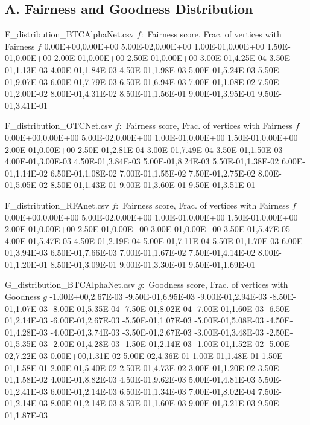 
\subsection*{A. Fairness and Goodness Distribution}


\begin{filecontents*}{F_distribution_BTCAlphaNet.csv}
  $f:$ Fairness score, Frac. of vertices with Fairness $f$
  0.00E+00,0.00E+00
  5.00E-02,0.00E+00
  1.00E-01,0.00E+00
  1.50E-01,0.00E+00
  2.00E-01,0.00E+00
  2.50E-01,0.00E+00
  3.00E-01,4.25E-04
  3.50E-01,1.13E-03
  4.00E-01,1.84E-03
  4.50E-01,1.98E-03
  5.00E-01,5.24E-03
  5.50E-01,9.07E-03
  6.00E-01,7.79E-03
  6.50E-01,6.94E-03
  7.00E-01,1.08E-02
  7.50E-01,2.00E-02
  8.00E-01,4.31E-02
  8.50E-01,1.56E-01
  9.00E-01,3.95E-01
  9.50E-01,3.41E-01
  \end{filecontents*}
  
  \begin{filecontents*}{F_distribution_OTCNet.csv}
  $f:$ Fairness score, Frac. of vertices with Fairness $f$
  0.00E+00,0.00E+00
  5.00E-02,0.00E+00
  1.00E-01,0.00E+00
  1.50E-01,0.00E+00
  2.00E-01,0.00E+00
  2.50E-01,2.81E-04
  3.00E-01,7.49E-04
  3.50E-01,1.50E-03
  4.00E-01,3.00E-03
  4.50E-01,3.84E-03
  5.00E-01,8.24E-03
  5.50E-01,1.38E-02
  6.00E-01,1.14E-02
  6.50E-01,1.08E-02
  7.00E-01,1.55E-02
  7.50E-01,2.75E-02
  8.00E-01,5.05E-02
  8.50E-01,1.43E-01
  9.00E-01,3.60E-01
  9.50E-01,3.51E-01
  \end{filecontents*}
  
  \begin{filecontents*}{F_distribution_RFAnet.csv}
  $f:$ Fairness score, Frac. of vertices with Fairness $f$
  0.00E+00,0.00E+00
  5.00E-02,0.00E+00
  1.00E-01,0.00E+00
  1.50E-01,0.00E+00
  2.00E-01,0.00E+00
  2.50E-01,0.00E+00
  3.00E-01,0.00E+00
  3.50E-01,5.47E-05
  4.00E-01,5.47E-05
  4.50E-01,2.19E-04
  5.00E-01,7.11E-04
  5.50E-01,1.70E-03
  6.00E-01,3.94E-03
  6.50E-01,7.66E-03
  7.00E-01,1.67E-02
  7.50E-01,4.14E-02
  8.00E-01,1.20E-01
  8.50E-01,3.09E-01
  9.00E-01,3.30E-01
  9.50E-01,1.69E-01
  \end{filecontents*}
  
  \begin{filecontents*}{G_distribution_BTCAlphaNet.csv}
  $g:$ Goodness score, Frac. of vertices with Goodness $g$
  -1.00E+00,2.67E-03
  -9.50E-01,6.95E-03
  -9.00E-01,2.94E-03
  -8.50E-01,1.07E-03
  -8.00E-01,5.35E-04
  -7.50E-01,8.02E-04
  -7.00E-01,1.60E-03
  -6.50E-01,2.14E-03
  -6.00E-01,2.67E-03
  -5.50E-01,1.07E-03
  -5.00E-01,5.08E-03
  -4.50E-01,4.28E-03
  -4.00E-01,3.74E-03
  -3.50E-01,2.67E-03
  -3.00E-01,3.48E-03
  -2.50E-01,5.35E-03
  -2.00E-01,4.28E-03
  -1.50E-01,2.14E-03
  -1.00E-01,1.52E-02
  -5.00E-02,7.22E-03
  0.00E+00,1.31E-02
  5.00E-02,4.36E-01
  1.00E-01,1.48E-01
  1.50E-01,1.58E-01
  2.00E-01,5.40E-02
  2.50E-01,4.73E-02
  3.00E-01,1.20E-02
  3.50E-01,1.58E-02
  4.00E-01,8.82E-03
  4.50E-01,9.62E-03
  5.00E-01,4.81E-03
  5.50E-01,2.41E-03
  6.00E-01,2.14E-03
  6.50E-01,1.34E-03
  7.00E-01,8.02E-04
  7.50E-01,2.14E-03
  8.00E-01,2.14E-03
  8.50E-01,1.60E-03
  9.00E-01,3.21E-03
  9.50E-01,1.87E-03
  \end{filecontents*}
  

